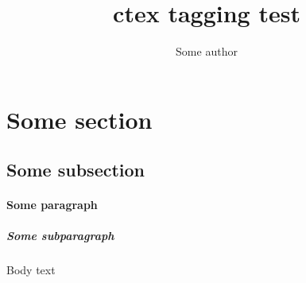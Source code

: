 \documentclass{ctexart}
\title{ctex tagging test}
\author{Some author}
\begin{document}
\maketitle
\tableofcontents
\section{Some section}
\subsection{Some subsection}
\paragraph{Some paragraph}
\subparagraph{Some subparagraph}
Body text

\CTeX
\end{document}
